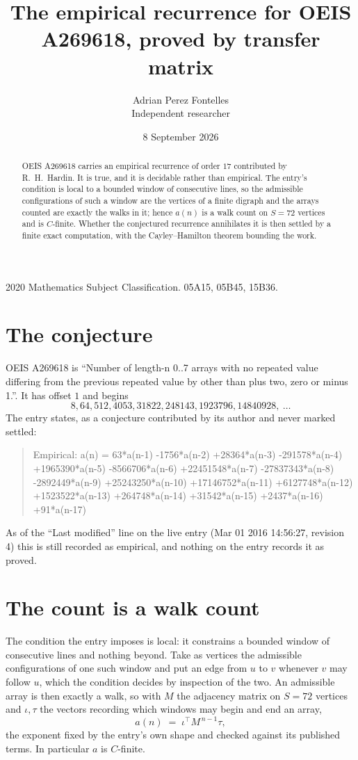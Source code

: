 \documentclass[11pt,a4paper]{article}
\title{The empirical recurrence for OEIS A269618, proved by transfer matrix}
\author{Adrian Perez Fontelles\\ \small Independent researcher}
\date{8 September 2026}
\theoremstyle{plain}
\theoremstyle{definition}
\begin{document}
\maketitle

\begin{abstract}
OEIS A269618 carries an empirical recurrence of order $17$ contributed by R.~H.~Hardin. It is
true, and it is decidable rather than empirical. The entry's condition is local to a bounded window of consecutive lines, so
the admissible configurations of such a window are the vertices of a finite digraph and the
arrays counted are exactly the walks in it; hence $a(n)$ is a walk count on $S=72$ vertices
and is $C$-finite. Whether the conjectured recurrence annihilates it is then settled by a
finite exact computation, with the Cayley--Hamilton theorem bounding the work.
\end{abstract}

\noindent\small 2020 Mathematics Subject Classification. 05A15, 05B45, 15B36.\normalsize

\section{The conjecture}

OEIS A269618 is ``Number of length-n 0..7 arrays with no repeated value differing from the previous repeated value by other than plus two, zero or minus 1.''. It has offset $1$ and begins
\[
8, 64, 512, 4053, 31822, 248143, 1923796, 14840928,\ \dots
\]
The entry states, as a conjecture contributed by its author and never marked settled:
\begin{quote}
Empirical: a(n) = 63*a(n-1) -1756*a(n-2) +28364*a(n-3) -291578*a(n-4) +1965390*a(n-5) -8566706*a(n-6) +22451548*a(n-7) -27837343*a(n-8) -2892449*a(n-9) +25243250*a(n-10) +17146752*a(n-11) +6127748*a(n-12) +1523522*a(n-13) +264748*a(n-14) +31542*a(n-15) +2437*a(n-16) +91*a(n-17)
\end{quote}
As of the ``Last modified'' line on the live entry (Mar 01 2016 14:56:27, revision 4) this is still
recorded as empirical, and nothing on the entry records it as proved.

\section{The count is a walk count}

The condition the entry imposes is local: it constrains a bounded window of consecutive lines and nothing beyond. Take as
vertices the admissible configurations of one such window and put an edge from $u$ to $v$
whenever $v$ may follow $u$, which the condition decides by inspection of the two. An
admissible array is then exactly a walk, so with $M$ the adjacency matrix on $S=72$ vertices
and $\iota,\tau$ the vectors recording which windows may begin and end an array,
\[
a(n)\;=\;\iota^{\!\top}M^{\,n-1}\tau ,
\]
the exponent fixed by the entry's own shape and checked against its published terms. In
particular $a$ is $C$-finite.
\end{document}
